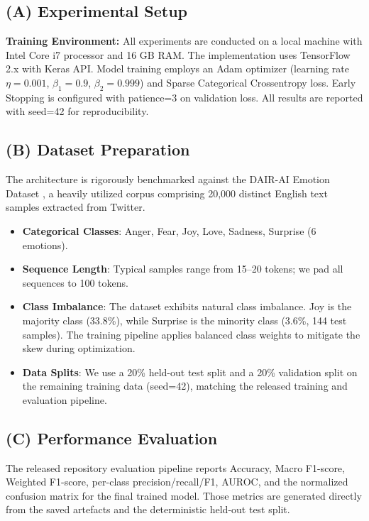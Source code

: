 \documentclass[conference]{IEEEtran}
\begin{document}
\subsection{(A) Experimental Setup}

\textbf{Training Environment:} All experiments are conducted on a local machine with Intel Core i7 processor and 16 GB RAM. The implementation uses TensorFlow 2.x with Keras API. Model training employs an Adam optimizer (learning rate $\eta = 0.001$, $\beta_1 = 0.9$, $\beta_2 = 0.999$) and Sparse Categorical Crossentropy loss. Early Stopping is configured with patience=3 on validation loss. All results are reported with seed=42 for reproducibility.

\subsection{(B) Dataset Preparation}
The architecture is rigorously benchmarked against the DAIR-AI Emotion Dataset \cite{saravia2018}, a heavily utilized corpus comprising 20,000 distinct English text samples extracted from Twitter.
\begin{itemize}
  \item \textbf{Categorical Classes}: Anger, Fear, Joy, Love, Sadness, Surprise (6 emotions).
  \item \textbf{Sequence Length}: Typical samples range from 15--20 tokens; we pad all sequences to 100 tokens.
  \item \textbf{Class Imbalance}: The dataset exhibits natural class imbalance. Joy is the majority class (33.8\%), while Surprise is the minority class (3.6\%, 144 test samples). The training pipeline applies balanced class weights to mitigate the skew during optimization.
  \item \textbf{Data Splits}: We use a 20\% held-out test split and a 20\% validation split on the remaining training data (seed=42), matching the released training and evaluation pipeline.
\end{itemize}

\subsection{(C) Performance Evaluation}
The released repository evaluation pipeline reports Accuracy, Macro F1-score, Weighted F1-score, per-class precision/recall/F1, AUROC, and the normalized confusion matrix for the final trained model. Those metrics are generated directly from the saved artefacts and the deterministic held-out test split.
\end{document}
